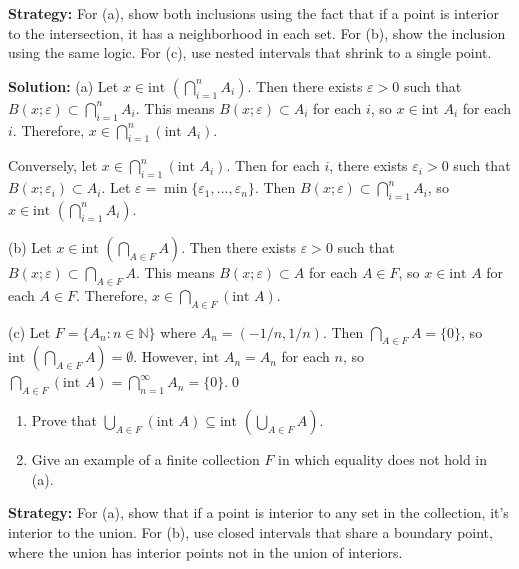 \noindent\textbf{Strategy:} For (a), show both inclusions using the fact that if a point is interior to the intersection, it has a neighborhood in each set. For (b), show the inclusion using the same logic. For (c), use nested intervals that shrink to a single point.

\bigskip\noindent\textbf{Solution:} 
(a) Let $x \in \text{int }(\bigcap_{i=1}^n A_i)$. Then there exists $\varepsilon > 0$ such that $B(x;\varepsilon) \subset \bigcap_{i=1}^n A_i$. This means $B(x;\varepsilon) \subset A_i$ for each $i$, so $x \in \text{int } A_i$ for each $i$. Therefore, $x \in \bigcap_{i=1}^n (\text{int } A_i)$.

Conversely, let $x \in \bigcap_{i=1}^n (\text{int } A_i)$. Then for each $i$, there exists $\varepsilon_i > 0$ such that $B(x;\varepsilon_i) \subset A_i$. Let $\varepsilon = \min\{\varepsilon_1, \ldots, \varepsilon_n\}$. Then $B(x;\varepsilon) \subset \bigcap_{i=1}^n A_i$, so $x \in \text{int }(\bigcap_{i=1}^n A_i)$.

(b) Let $x \in \text{int }(\bigcap_{A \in F} A)$. Then there exists $\varepsilon > 0$ such that $B(x;\varepsilon) \subset \bigcap_{A \in F} A$. This means $B(x;\varepsilon) \subset A$ for each $A \in F$, so $x \in \text{int } A$ for each $A \in F$. Therefore, $x \in \bigcap_{A \in F} (\text{int } A)$.

(c) Let $F = \{A_n : n \in \mathbb{N}\}$ where $A_n = (-1/n, 1/n)$. Then $\bigcap_{A \in F} A = \{0\}$, so $\text{int }(\bigcap_{A \in F} A) = \emptyset$. However, $\text{int } A_n = A_n$ for each $n$, so $\bigcap_{A \in F} (\text{int } A) = \bigcap_{n=1}^{\infty} A_n = \{0\}$.\qed


\begin{problembox}
\begin{problemstatement}
\begin{enumerate}[label=\alph*)]
\item Prove that \(\bigcup_{A \in F} (\text{int } A) \subseteq \text{int } \left(\bigcup_{A \in F} A\right)\).
\item Give an example of a finite collection \( F \) in which equality does not hold in (a).
\end{enumerate}
\end{problemstatement}
\end{problembox}

\noindent\textbf{Strategy:} For (a), show that if a point is interior to any set in the collection, it's interior to the union. For (b), use closed intervals that share a boundary point, where the union has interior points not in the union of interiors.

